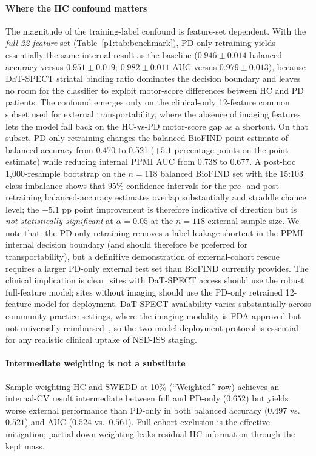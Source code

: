 \paragraph*{Where the HC confound matters} The magnitude of the training-label confound is feature-set dependent. With the \emph{full 22-feature} set (Table~\ref{p1:tab:benchmark}), PD-only retraining yields essentially the same internal result as the baseline ($0.946 \pm 0.014$ balanced accuracy versus $0.951 \pm 0.019$; $0.982 \pm 0.011$ AUC versus $0.979 \pm 0.013$), because DaT-SPECT striatal binding ratio dominates the decision boundary and leaves no room for the classifier to exploit motor-score differences between HC and PD patients. The confound emerges only on the clinical-only 12-feature common subset used for external transportability, where the absence of imaging features lets the model fall back on the HC-vs-PD motor-score gap as a shortcut. On that subset, PD-only retraining changes the balanced-BioFIND point estimate of balanced accuracy from 0.470 to 0.521 ($+5.1$ percentage points on the point estimate) while reducing internal PPMI AUC from 0.738 to 0.677. A post-hoc 1{,}000-resample bootstrap on the $n{=}118$ balanced BioFIND set with the 15:103 class imbalance shows that 95\% confidence intervals for the pre- and post-retraining balanced-accuracy estimates overlap substantially and straddle chance level; the $+5.1$ pp point improvement is therefore indicative of direction but is \emph{not statistically significant} at $\alpha{=}0.05$ at the $n{=}118$ external sample size. We note that: the PD-only retraining removes a label-leakage shortcut in the PPMI internal decision boundary (and should therefore be preferred for transportability), but a definitive demonstration of external-cohort rescue requires a larger PD-only external test set than BioFIND currently provides. The clinical implication is clear: sites with DaT-SPECT access should use the robust full-feature model; sites without imaging should use the PD-only retrained 12-feature model for deployment. DaT-SPECT availability varies substantially across community-practice settings, where the imaging modality is FDA-approved but not universally reimbursed~\cite{seibyl2018dat}, so the two-model deployment protocol is essential for any realistic clinical uptake of NSD-ISS staging.

\paragraph*{Intermediate weighting is not a substitute} Sample-weighting HC and SWEDD at 10\% (``Weighted'' row) achieves an internal-CV result intermediate between full and PD-only ($0.652$) but yields worse external performance than PD-only in both balanced accuracy ($0.497$ vs.\ $0.521$) and AUC ($0.524$ vs.\ $0.561$). Full cohort exclusion is the effective mitigation; partial down-weighting leaks residual HC information through the kept mass.


